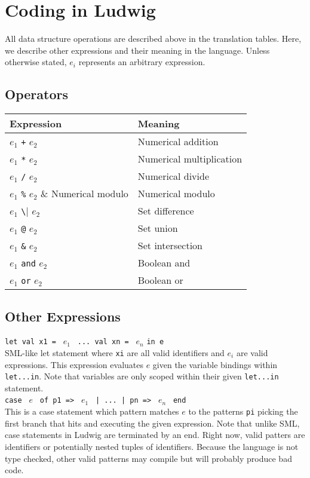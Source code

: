 \section{Coding in Ludwig}

All data structure operations are described above in the translation tables. Here, we describe other expressions and their meaning in the language. Unless otherwise stated, $e_i$ represents an arbitrary expression.

\subsection{Operators}
\begin{tabular}{| l l |}
\hline
\textbf{Expression} & \textbf{Meaning}\\
\hline
$e_1$ \verb|+| $e_2$ & Numerical addition\\
$e_1$ \verb|*| $e_2$ & Numerical multiplication\\ 
$e_1$ \verb|/| $e_2$ & Numerical divide\\
$e_1$ \verb|%| $e_2$ & Numerical modulo\\ 
$e_1$ \verb|\| $e_2$ & Set difference\\
$e_1$ \verb|@| $e_2$ & Set union\\
$e_1$ \verb|&| $e_2$ & Set intersection\\
$e_1$ \verb|and| $e_2$ & Boolean and\\
$e_1$ \verb|or| $e_2$ & Boolean or\\
\hline
\end{tabular}

\subsection{Other Expressions}
\verb|let val x1 = | $e_1$ \verb| ... val xn = | $e_n$ \verb|in e|\\

SML-like let statement where \verb|xi| are all valid identifiers and $e_i$ are valid expressions. This expression evaluates $e$ given the variable bindings within \verb|let...in|. Note that variables are only scoped within their given \verb|let...in| statement.\\

\verb|case | $e$ \verb| of p1 => | $e_1$ \verb" | ... | pn => " $e_n$ \verb| end|\\

This is a case statement which pattern matches $e$ to the patterns \verb|pi| picking the first branch that hits and executing the given expression. Note that unlike SML, case statements in Ludwig are terminated by an end. Right now, valid patters are identifiers or potentially nested tuples of identifiers. Because the language is not type checked, other valid patterns may compile but will probably produce bad code.\\

